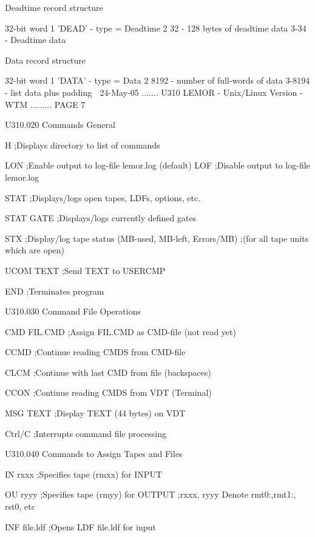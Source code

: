    Deadtime record structure
 
   32-bit word  1       'DEAD'  - type = Deadtime
                2        32     - 128 bytes of deadtime data
                3-34            - Deadtime data
 
   Data record structure
 
   32-bit word  1       'DATA'  - type = Data
                2        8192   - number of full-words of data
                3-8194          - list data plus padding
    
   24-May-05 ....... U310  LEMOR - Unix/Linux Version - WTM ......... PAGE   7
 
 
   U310.020  Commands General
 
   H             ;Displays directory to list of commands
 
   LON           ;Enable  output to log-file lemor.log (default)
   LOF           ;Disable output to log-file lemor.log
 
   STAT          ;Displays/logs open tapes, LDFs, options, etc.
 
   STAT GATE     ;Displays/logs currently defined gates
 
   STX           ;Display/log tape status (MB-used, MB-left, Errors/MB)
                 ;(for all tape units which are open)
 
   UCOM TEXT     ;Send TEXT to USERCMP
 
   END           ;Terminates program
 
 
   U310.030  Command File Operations
 
   CMD  FIL.CMD  ;Assign FIL.CMD as CMD-file (not read yet)
 
   CCMD          ;Continue reading  CMDS from CMD-file
 
   CLCM          ;Continue with last CMD from file (backspaces)
 
   CCON          ;Continue reading  CMDS from VDT (Terminal)
 
   MSG  TEXT     ;Display TEXT (44 bytes) on VDT
 
   Ctrl/C        ;Interrupts command file processing
 
 
   U310.040  Commands to Assign Tapes and Files
 
   IN   rxxx     ;Specifies tape (rmxx) for INPUT
 
   OU   ryyy     ;Specifies tape (rmyy) for OUTPUT
                 ;rxxx, ryyy Denote rmt0:,rmt1:, rst0,  etc
 
   INF  file.ldf ;Opens LDF file.ldf for input
 
